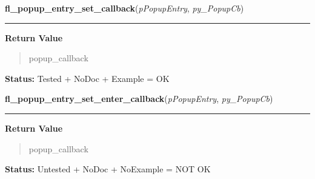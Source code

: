 \hspace{.8\funcindent}\begin{boxedminipage}{\funcwidth}

    \raggedright \textbf{fl\_popup\_entry\_set\_callback}(\textit{pPopupEntry}, \textit{py\_PopupCb})

    \vspace{-1.5ex}

    \rule{\textwidth}{0.5\fboxrule}
\setlength{\parskip}{2ex}
\setlength{\parskip}{1ex}
      \textbf{Return Value}
    \vspace{-1ex}

      \begin{quote}
      popup\_callback

      \end{quote}

\textbf{Status:} Tested + NoDoc + Example = OK



    \end{boxedminipage}

    \label{xformslib:library:fl_popup_entry_set_enter_callback}

    \vspace{0.5ex}

\hspace{.8\funcindent}\begin{boxedminipage}{\funcwidth}

    \raggedright \textbf{fl\_popup\_entry\_set\_enter\_callback}(\textit{pPopupEntry}, \textit{py\_PopupCb})

    \vspace{-1.5ex}

    \rule{\textwidth}{0.5\fboxrule}
\setlength{\parskip}{2ex}
\setlength{\parskip}{1ex}
      \textbf{Return Value}
    \vspace{-1ex}

      \begin{quote}
      popup\_callback

      \end{quote}

\textbf{Status:} Untested + NoDoc + NoExample = NOT OK



    \end{boxedminipage}

    \label{xformslib:library:fl_popup_entry_set_leave_callback}

